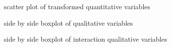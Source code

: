\documentclass{article}
\begin{document}
\begin{center}
  \begin{figure}
    \caption{scatter plot of transformed quantitative variables}
  \end{figure}

  \begin{figure}
    \caption{side by side boxplot of qualitative variables}
  \end{figure}

  \begin{figure}
    \caption{side by side boxplot of interaction qualitative variables}
  \end{figure}


\end{center}
\end{document}
